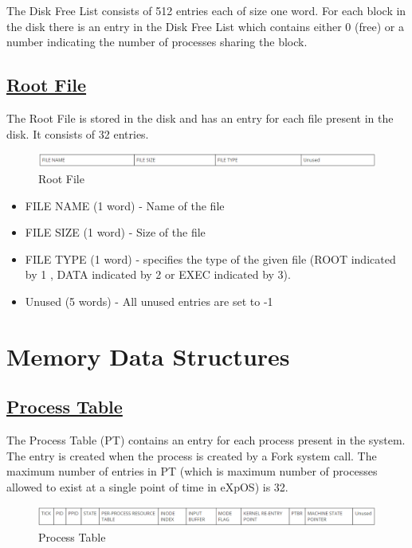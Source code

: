 The Disk Free List consists of 512 entries each of size one word. For each block in the disk there is an entry in the Disk Free List which contains either 0 (free) or a number indicating the number of processes sharing the block.

\subsection{\href{http://exposnitc.github.io/os_design-files/disk_ds.html#root_file}{Root File}}

The Root File is stored in the disk and has an entry for each file present in the disk. It consists of 32 entries.

\begin{figure}[ht]
\centering
\includegraphics  [scale=0.55]{figures/ROOT.png}
\caption{\footnotesize Root File}
\end{figure}

\begin{itemize}

\item FILE NAME (1 word) - Name of the file
\item FILE SIZE (1 word) - Size of the file
\item FILE TYPE (1 word) - specifies the type of the given file (ROOT indicated by 1 , DATA indicated by 2 or EXEC indicated by 3).
\item Unused (5 words) - All unused entries are set to -1
\end{itemize}

\section {Memory Data Structures}

\subsection{\href{http://exposnitc.github.io/os_design-files/process_table.html}{Process Table}}

The Process Table (PT) contains an entry for each process present in the system. The entry is created when the process is created by a Fork system call. The maximum number of entries in PT (which is maximum number of processes allowed to exist at a single point of time in eXpOS) is 32.

\begin{figure}[ht]
\centering
\includegraphics  [scale=0.55]{figures/pt.png}
\caption{\footnotesize Process Table}
\end{figure}

